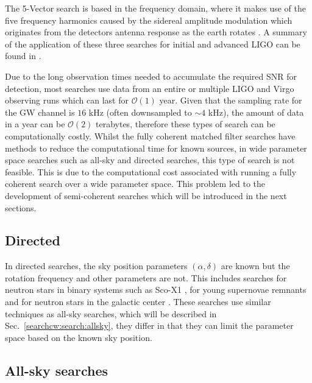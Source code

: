 The 5-Vector search is based in the frequency domain, where it makes
use of the five frequency harmonics caused by the sidereal amplitude
modulation which originates from the detectors antenna response as
the earth rotates \citep{astone2010MethodDetection,aasi2014GRAVITATIONALWAVES}.
A summary of the application of these three searches for initial and advanced
\gls{LIGO} can be found in
\citep{aasi2014GRAVITATIONALWAVES,abbott2019SearchesGravitationala}.

Due to the long observation times needed to accumulate the required \gls{SNR}
for detection, most searches use data from an entire or multiple \gls{LIGO} and Virgo observing runs
which can last for $\mathcal{O}(1)$ year.  Given
that the sampling rate for the \gls{GW} channel is $16$ kHz (often downsampled
to $\sim 4$ kHz), the amount of data in a year can be $\mathcal{O}(2)$
terabytes, therefore these types of search can be computationally costly.
Whilst the fully coherent matched filter searches have methods to reduce the
computational time for known sources, in wide parameter space searches such as all-sky and directed searches, this
type of search is not feasible. 
This is due to the computational cost associated with running a fully coherent search over a wide parameter space.
This problem led to the development of semi-coherent searches which will be introduced in the
next sections. 

\subsection{\label{searchcw:search:directed}Directed}

In directed searches, the sky position parameters
$(\alpha,\delta)$ are known but the rotation frequency and other parameters are not. 
This includes searches for neutron stars in binary systems such as Sco-X1
\citep{abbott2017UpperLimits,meadors2016TuningScorpius}, for young supernovae remnants \citep{abadie2010FIRSTSEARCH} and for neutron stars in the galactic center \citep{piccinni2019DirectedSearch}. These searches use similar techniques as all-sky searches, which will be described in
Sec.~\ref{searchcw:search:allsky}, they differ in that they can limit the
parameter space based on the known sky position.

\subsection{\label{searchcw:search:allsky}All-sky searches}

